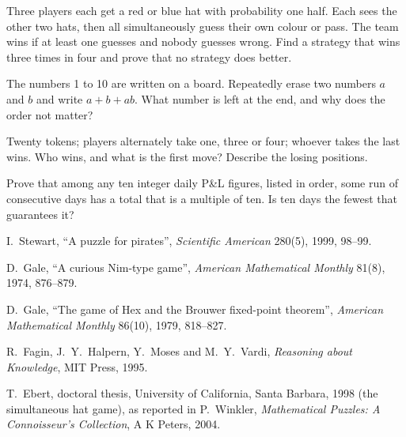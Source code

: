 \begin{interviewq}\label{iq:iv:brainteasers-and-logic:11}
Three players each get a red or blue hat with probability one half. Each sees the other two hats, then all
simultaneously guess their own colour or pass. The team wins if at least one guesses and nobody guesses wrong. Find
a strategy that wins three times in four and prove that no strategy does better.
\end{interviewq}

\begin{interviewq}\label{iq:iv:brainteasers-and-logic:12}
The numbers 1 to 10 are written on a board. Repeatedly erase two numbers $a$ and $b$ and write $a + b + ab$.
What number is left at the end, and why does the order not matter?
\end{interviewq}

\begin{interviewq}\label{iq:iv:brainteasers-and-logic:13}
Twenty tokens; players alternately take one, three or four; whoever takes the last wins. Who wins, and what is the
first move? Describe the losing positions.
\end{interviewq}

\begin{interviewq}\label{iq:iv:brainteasers-and-logic:14}
Prove that among any ten integer daily P\&L figures, listed in order, some run of consecutive days has a total
that is a multiple of ten. Is ten days the fewest that guarantees it?
\end{interviewq}

\begin{omsources}
\item I.~Stewart, ``A puzzle for pirates'', \emph{Scientific American} 280(5), 1999, 98--99.
\item D.~Gale, ``A curious Nim-type game'', \emph{American Mathematical Monthly} 81(8), 1974, 876--879.
\item D.~Gale, ``The game of Hex and the Brouwer fixed-point theorem'', \emph{American Mathematical Monthly}
86(10), 1979, 818--827.
\item R.~Fagin, J.~Y.~Halpern, Y.~Moses and M.~Y.~Vardi, \emph{Reasoning about Knowledge}, MIT Press, 1995.
\item T.~Ebert, doctoral thesis, University of California, Santa Barbara, 1998 (the simultaneous hat game), as
reported in P.~Winkler, \emph{Mathematical Puzzles: A Connoisseur's Collection}, A K Peters, 2004.
\end{omsources}
